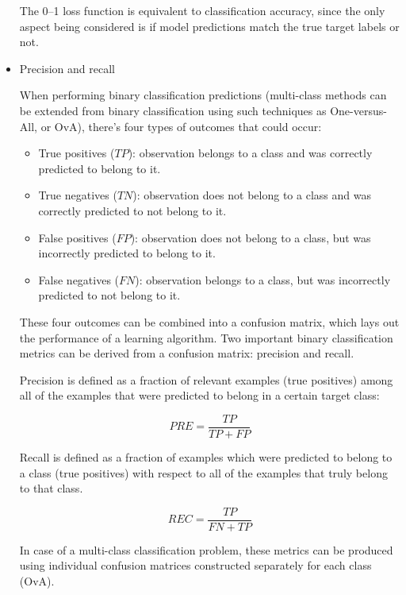 \begin{itemize}
    The 0--1 loss function is equivalent to classification accuracy, since the only aspect being considered is if model predictions match the true target labels or not.

    \item Precision and recall

    When performing binary classification predictions (multi-class methods can be extended from binary classification using such techniques as One-versus-All, or OvA), there's four types of outcomes that could occur:

    \begin{itemize}
        \item True positives ($TP$): observation belongs to a class and was correctly predicted to belong to it.
        \item True negatives ($TN$): observation does not belong to a class and was correctly predicted to not belong to it.
        \item False positives ($FP$): observation does not belong to a class, but was incorrectly predicted to belong to it.
        \item False negatives ($FN$): observation belongs to a class, but was incorrectly predicted to not belong to it.
    \end{itemize}

    These four outcomes can be combined into a confusion matrix, which lays out the performance of a learning algorithm.
    Two important binary classification metrics can be derived from a confusion matrix: precision and recall.

    Precision is defined as a fraction of relevant examples (true positives) among all of the examples that were predicted to belong in a certain target class:

    \begin{equation} \label{eq:precision}
        PRE = \frac{TP} {TP + FP}
    \end{equation}

    Recall is defined as a fraction of examples which were predicted to belong to a class (true positives) with respect to all of the examples that truly belong to that class.

    \begin{equation} \label{eq:recall}
        REC = \frac{TP} {FN + TP}
    \end{equation}

    In case of a multi-class classification problem, these metrics can be produced using individual confusion matrices constructed separately for each class (OvA).


\end{itemize}

